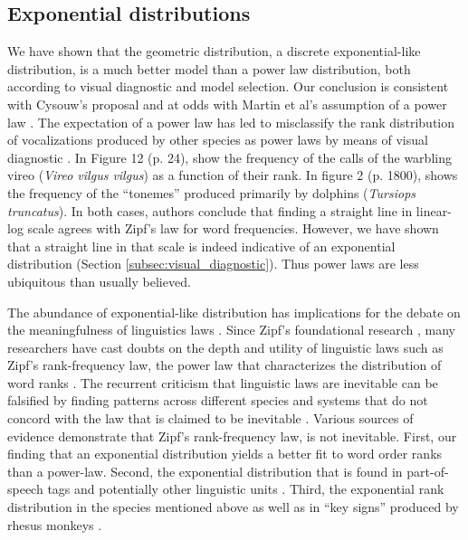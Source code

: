 \documentclass[USenglish]{article}
\begin{document}
\subsection{Exponential distributions}

We have shown that the geometric distribution, a discrete exponential-like distribution, is a much better model than a power law distribution, both according to visual diagnostic and model selection. Our conclusion is consistent with Cysouw's proposal \citep{Cysouw2010a} and at odds with Martin et al's assumption of a power law \citep{Martin2020a}. The expectation of a power law has led to misclassify the rank distribution of vocalizations produced by other species as power laws by means of visual diagnostic \citep{Howes-Jones1988a,Dreher1961a,Janik2006a}. In Figure 12 (p. 24), \citet{Howes-Jones1988a} show the frequency of the calls of the warbling vireo ({\em Vireo vilgus vilgus}) as a function of their rank. 
In figure 2 (p. 1800), \citet{Dreher1961a} shows the frequency of the ``tonemes'' produced primarily by dolphins ({\em Tursiops
truncatus}). In both cases, authors conclude that finding a straight line in linear-log scale agrees with Zipf's law for word frequencies. However, we have shown that a straight line in that scale is indeed indicative of an exponential distribution (Section \ref{subsec:visual_diagnostic}). Thus power laws are less ubiquitous than usually believed.  

The abundance of exponential-like distribution has implications for the debate on the meaningfulness of linguistics laws \citep[Box 2]{Semple2021a}. Since Zipf's foundational research \citep{Zipf1949a}, many researchers have cast doubts on the depth and utility of linguistic laws such as Zipf's rank-frequency law, the power law that characterizes the distribution of word ranks \citep{Zipf1949a,Moreno2016a,Mehri2017a}. The recurrent criticism that linguistic laws are inevitable can be falsified by finding patterns across different species and systems that do not concord with the law that is claimed to be inevitable \citep{Semple2021a}. Various sources of evidence demonstrate that Zipf's rank-frequency law, is not inevitable. First, our finding that an exponential distribution yields a better fit to word order ranks than a power-law. Second, the exponential distribution that is found in part-of-speech tags \citep{Tuzzi2010a} and potentially other linguistic units \citep{Cysouw2010a}. Third, the exponential rank distribution in the species mentioned above as well as in ``key signs'' produced by rhesus monkeys \citep[Figure 3, p. 367]{Schleidt1973a}.
\iftoggle{extra}{
Fourth, the exponential distribution of other linguistic variables such as the distance between syntactically related words \citep{Ferrer2004b,Petrini2022c}.
Finally, in non-linguistic contexts, the projection distances between cortical areas exhibit an exponential distribution \citep{Ercsey2013a} and a double exponential distribution characterizes the average distance traversed by foraging ants \citep{Campos2016a}, just to name a few. 
}
{}
\end{document}
